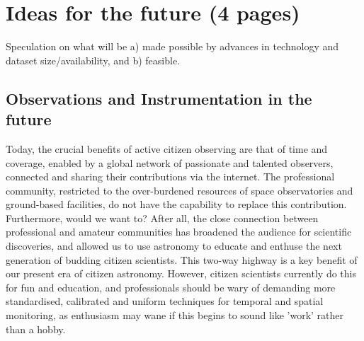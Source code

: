 \documentclass{ar2e}
\begin{document}

\section{Ideas for the future (4 pages)}
\label{sec:future}

Speculation on what will be a) made possible by advances in technology and
dataset size/availability, and b) feasible.


\subsection{Observations and Instrumentation in the future}
\label{sec:future:obs}

% 
% 
% 
% 


Today, the crucial benefits of active citizen observing are that of time and
coverage, enabled by a global network of passionate and talented observers,
connected and sharing their contributions via the internet.  The professional
community, restricted to the over-burdened resources of space observatories
and ground-based facilities, do not have the capability to replace this
contribution. Furthermore, would we want to?  After all, the close connection
between professional and amateur communities has broadened the audience for
scientific discoveries, and allowed us to use astronomy to educate and enthuse
the next generation of budding citizen scientists.  This two-way highway is a
key benefit of our present era of citizen astronomy.  However, citizen
scientists currently do this for fun and education, and professionals should
be wary of demanding more standardised, calibrated and uniform techniques for
temporal and spatial monitoring, as enthusiasm may wane if this begins to
sound like 'work' rather than a hobby.
\end{document}
